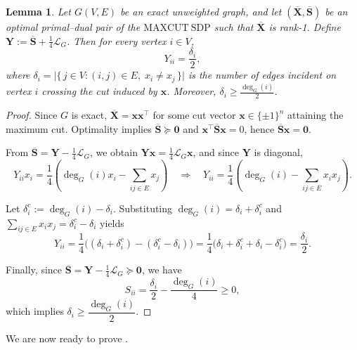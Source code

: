 \documentclass[a4paper,fleqn]{cas-sc}
\newcommand{\X}{\mathbf{X}}
\renewcommand{\L}{\mathcal{L}}
\newcommand{\1}{\mathbf{1}}
\newcommand{\x}{\mathbf{x}}
\newcommand{\bz}{\mathbf{0}}
\newcommand{\bS}{\mathbf{S}}
\newcommand{\Y}{\mathbf{Y}}
\newtheorem{lemma}[theorem]{Lemma}
\begin{document}
\begin{lemma}\label{lem:2}
Let $G(V,E)$ be an exact unweighted graph, and let $(\overline{\X}, \overline{\bS})$ be an optimal primal--dual pair of the $\mathrm{MAXCUT\ SDP}$ such that $\overline{\X}$ is rank-1. 
Define $\Y := \overline{\bS} + \tfrac{1}{4}\L_G$. 
Then for every vertex $i \in V$,
\[
Y_{ii} = \frac{\delta_i}{2},
\]
where $\delta_i = \bigl|\{\, j \in V : (i,j) \in E,\; x_i \neq x_j \,\}\bigr|$ 
is the number of edges incident on vertex $i$ crossing the cut induced by $\x$. 
Moreover, $\delta_i \ge \tfrac{\deg_G(i)}{2}$.
\end{lemma}

\begin{proof}
Since $G$ is exact, $\overline{\X} = \x\x^{\top}$ for some cut vector $\x \in \{\pm 1\}^n$ attaining the maximum cut. 
Optimality implies $\overline{\bS} \succeq \bz$ and $\x^{\top}\overline{\bS}\x = 0$, hence $\overline{\bS}\x = \mathbf{0}$. 

From $\overline{\bS} = \Y - \tfrac{1}{4}\L_G$, we obtain $\Y\x = \tfrac{1}{4}\L_G\x$, and since $\Y$ is diagonal,
\[
Y_{ii}x_i = \dfrac{1}{4}\!\left(\deg_G(i) x_i - \sum_{ij \in E} x_j\right)
\quad\Rightarrow\quad
Y_{ii} = \dfrac{1}{4}\!\left(\deg_G(i) - \sum_{ij \in E} x_i x_j\right).
\]

Let $\delta_i^c := \deg_G(i) - \delta_i$. Substituting $\deg_G(i) = \delta_i + \delta_i^c$ and $\displaystyle \sum_{ij \in E} x_i x_j = \delta_i^c - \delta_i$ yields
\[
Y_{ii}
= \dfrac{1}{4}\bigl((\delta_i + \delta_i^c) - (\delta_i^c - \delta_i)\bigr)
= \dfrac{1}{4}\bigl(\delta_i + \delta_i^c + \delta_i - \delta_i^c\bigr)
= \frac{\delta_i}{2}.
\]

Finally, since $\overline{\bS} = \Y - \tfrac{1}{4}\L_G \succeq \bz$, we have
\[
S_{ii} = \frac{\delta_i}{2} - \frac{\deg_G(i)}{4} \ge 0,
\]
which implies $\delta_i \ge \dfrac{\deg_G(i)}{2}$.
\end{proof}

We are now ready to prove .
\end{document}
